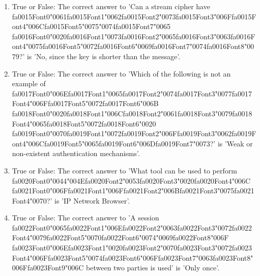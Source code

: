 \documentclass[12pt]{article}
\begin{document}
\begin{enumerate}[label=\arabic*.]
\item True or False: The correct answer to 'Can a stream cipher have {\csname fa0015Font0\endcsname\char"0061}{\csname fa0015Font1\endcsname\char"0062}{\csname fa0015Font2\endcsname\char"0073}{\csname fa0015Font3\endcsname\char"006F}{\csname fa0015Font4\endcsname\char"006C}{\csname fa0015Font5\endcsname\char"0075}{\char"0074}{\csname fa0015Font7\endcsname\char"0065} {\csname fa0016Font0\endcsname\char"0020}{\csname fa0016Font1\endcsname\char"0073}{\csname fa0016Font2\endcsname\char"0065}{\csname fa0016Font3\endcsname\char"0063}{\csname fa0016Font4\endcsname\char"0075}{\csname fa0016Font5\endcsname\char"0072}{\csname fa0016Font6\endcsname\char"0069}{\csname fa0016Font7\endcsname\char"0074}{\csname fa0016Font8\endcsname\char"0079}?' is 'No, since the key is shorter than the message'.
\item True or False: The correct answer to 'Which of the following is not an example of {\csname fa0017Font0\endcsname\char"006E}{\csname fa0017Font1\endcsname\char"0065}{\csname fa0017Font2\endcsname\char"0074}{\csname fa0017Font3\endcsname\char"0077}{\csname fa0017Font4\endcsname\char"006F}{\csname fa0017Font5\endcsname\char"0072}{\csname fa0017Font6\endcsname\char"006B} {\csname fa0018Font0\endcsname\char"0020}{\csname fa0018Font1\endcsname\char"006C}{\csname fa0018Font2\endcsname\char"0061}{\csname fa0018Font3\endcsname\char"0079}{\csname fa0018Font4\endcsname\char"0065}{\csname fa0018Font5\endcsname\char"0072}{\csname fa0018Font6\endcsname\char"0020} {\csname fa0019Font0\endcsname\char"0070}{\csname fa0019Font1\endcsname\char"0072}{\csname fa0019Font2\endcsname\char"006F}{\csname fa0019Font3\endcsname\char"0062}{\csname fa0019Font4\endcsname\char"006C}{\csname fa0019Font5\endcsname\char"0065}{\csname fa0019Font6\endcsname\char"006D}{\csname fa0019Font7\endcsname\char"0073}?' is 'Weak or non-existent authentication mechanisms'.
\item True or False: The correct answer to 'What tool can be used to perform {\csname fa0020Font0\endcsname\char"0044}{\char"004E}{\csname fa0020Font2\endcsname\char"0053}{\csname fa0020Font3\endcsname\char"0020}{\csname fa0020Font4\endcsname\char"006C} {\csname fa0021Font0\endcsname\char"006F}{\csname fa0021Font1\endcsname\char"006F}{\csname fa0021Font2\endcsname\char"006B}{\csname fa0021Font3\endcsname\char"0075}{\csname fa0021Font4\endcsname\char"0070}?' is 'IP Network Browser'.
\item True or False: The correct answer to 'A session {\csname fa0022Font0\endcsname\char"0065}{\csname fa0022Font1\endcsname\char"006E}{\csname fa0022Font2\endcsname\char"0063}{\csname fa0022Font3\endcsname\char"0072}{\csname fa0022Font4\endcsname\char"0079}{\csname fa0022Font5\endcsname\char"0070}{\csname fa0022Font6\endcsname\char"0074}{\char"0069}{\csname fa0022Font8\endcsname\char"006F} {\csname fa0023Font0\endcsname\char"006E}{\csname fa0023Font1\endcsname\char"0020}{\csname fa0023Font2\endcsname\char"0070}{\csname fa0023Font3\endcsname\char"0072}{\csname fa0023Font4\endcsname\char"006F}{\csname fa0023Font5\endcsname\char"0074}{\csname fa0023Font6\endcsname\char"006F}{\csname fa0023Font7\endcsname\char"0063}{\csname fa0023Font8\endcsname\char"006F}{\csname fa0023Font9\endcsname\char"006C} between two parties is used' is 'Only once'.

\end{enumerate}
\end{document}
